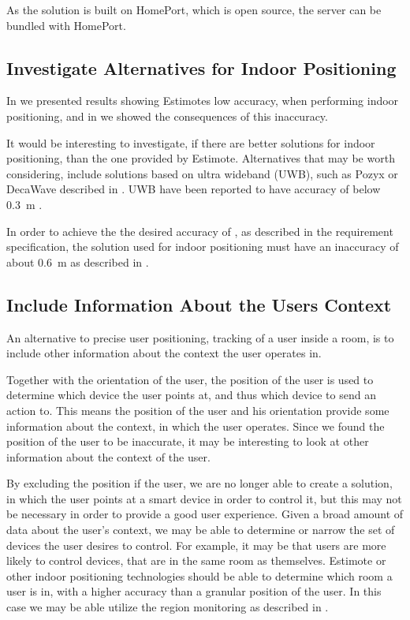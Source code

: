 As the solution is built on HomePort, which is open source, 
the server can be bundled with HomePort.

\subsection{Investigate Alternatives for Indoor Positioning}

In  we presented results showing Estimotes low accuracy, 
when performing indoor positioning, 
and in  we showed the consequences of this inaccuracy.

It would be interesting to investigate, 
if there are better solutions for indoor positioning, 
than the one provided by Estimote.
Alternatives that may be worth considering, 
include solutions based on ultra wideband (UWB), 
such as Pozyx or DecaWave described in .
UWB have been reported to have accuracy of below \SI{0.3}{\meter} \cite{Liu:4343996}.

In order to achieve the the desired accuracy of , 
as described in the requirement specification, 
the solution used for indoor positioning must have an inaccuracy of about \SI{0.6}{\meter}
as described in .

\subsection{Include Information About the Users Context}

An alternative to precise user positioning, 
\ie tracking of a user inside a room, 
is to include other information about the context the user operates in.

Together with the orientation of the user, 
the position of the user is used to determine which device the user points at, 
and thus which device to send an action to. 
This means the position of the user and his orientation provide some information about the context, 
in which the user operates. 
Since we found the position of the user to be inaccurate, 
it may be interesting to look at other information about the context of the user.

By excluding the position if the user, 
we are no longer able to create a solution, 
in which the user points at a smart device in order to control it, 
but this may not be necessary in order to provide a good user experience. 
Given a broad amount of data about the user's context, 
we may be able to determine or narrow the set of devices the user desires to control. 
For example, it may be that users are more likely to control devices, 
that are in the same room as themselves. 
Estimote or other indoor positioning technologies should be able to determine which room a user is in, 
with a higher accuracy than a granular position of the user. In this case we may be able utilize the region monitoring as described in .

